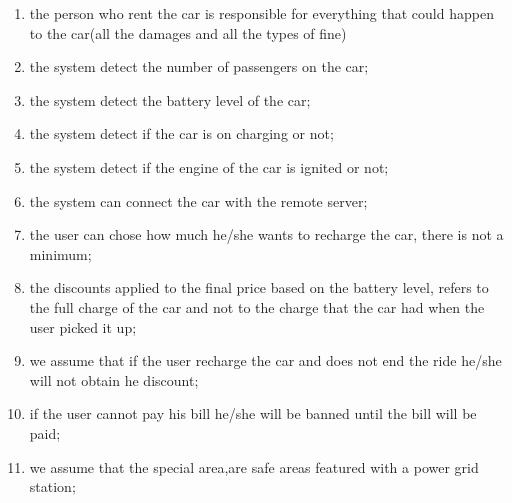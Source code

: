 \begin{enumerate}
	\item the person who rent the car is responsible for everything that could happen to the car(all the damages and all the types of fine)
	\item the system detect the number of passengers on the car;
	\item the system detect the battery level of the car;
	\item the system detect if the car is on charging or not;
	\item the system detect if the engine of the car is ignited or not;
	\item the system can connect the car with the remote server;
	\item the user can chose how much he/she wants to recharge the car, there is not a minimum;
	\item the discounts applied to the final price based on the battery level, refers to the full charge of the car and not to the charge that the car had when the user picked it up;
	\item we assume that if the user recharge the car and does not end the ride he/she will not obtain he discount;
	\item if the user cannot pay his bill he/she will be banned until the bill will be paid;
	\item we assume that the special area,are safe areas featured with a power grid station;
\end{enumerate}